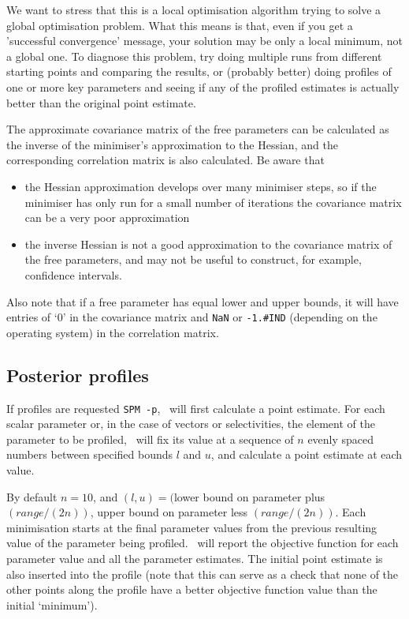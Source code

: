 We want to stress that this is a local optimisation algorithm trying to solve a global optimisation problem. What this means is that, even if you get a 'successful convergence' message, your solution may be only a local minimum, not a global one. To diagnose this problem, try doing multiple runs from different starting points and comparing the results, or (probably better) doing profiles of one or more key parameters and seeing if any of the profiled estimates is actually better than the original point estimate.

The approximate covariance matrix of the free parameters can be calculated as the inverse of the minimiser's approximation to the Hessian, and the corresponding correlation matrix is also calculated. Be aware that

\begin{itemize}
\item the Hessian approximation develops over many minimiser steps, so if the minimiser has only run for a small number of iterations the covariance matrix can be a very poor approximation
\item the inverse Hessian is not a good approximation to the covariance matrix of the free parameters, and may not be useful to construct, for example, confidence intervals. 
\end{itemize}

Also note that if a free parameter has equal lower and upper bounds, it will have entries of `0' in the covariance matrix and \texttt{NaN} or \texttt{-1.\#IND} (depending on the operating system) in the correlation matrix. 

\subsection{Posterior profiles}

If profiles are requested \texttt{SPM -p}, \SPM\ will first calculate a point estimate. For each scalar parameter or, in the case of vectors or selectivities, the element of the parameter to be profiled, \SPM\ will fix its value at a sequence of $n$ evenly spaced numbers between specified bounds $l$ and $u$, and calculate a point estimate at each value. 

By default $n=10$, and $(l, u)=($lower bound on parameter plus $(range/(2n))$, upper bound on parameter less $(range/(2n))$. Each minimisation starts at the final parameter values from the previous resulting value of the parameter being profiled. \SPM\ will report the objective function for each parameter value and all the parameter estimates. The initial point estimate is also inserted into the profile (note that this can serve as a check that none of the other points along the profile have a better objective function value than the initial `minimum').

